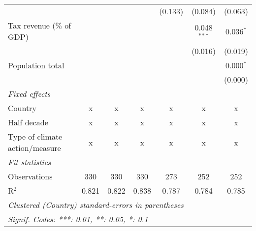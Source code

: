 \begin{tabular}{lcccccc}
                                                            &         &             &                & (0.133)        & (0.084)        & (0.063)\\   
   Tax revenue (\% of GDP)                                  &         &             &                &                & 0.048$^{***}$  & 0.036$^{*}$\\   
                                                            &         &             &                &                & (0.016)        & (0.019)\\   
   Population total                                         &         &             &                &                &                & 0.000$^{*}$\\   
                                                            &         &             &                &                &                & (0.000)\\   
   \emph{Fixed effects}\\
   Country                                                  & x       & x           & x              & x              & x              & x\\  
   Half decade                                              & x       & x           & x              & x              & x              & x\\  
   Type of climate action/measure                           & x       & x           & x              & x              & x              & x\\  
   \midrule \emph{Fit statistics}\\
   Observations                                             & 330     & 330         & 330            & 273            & 252            & 252\\  
   R$^2$                                                    & 0.821   & 0.822       & 0.838          & 0.787          & 0.784          & 0.785\\  
   \midrule
   \multicolumn{7}{l}{\emph{Clustered (Country) standard-errors in parentheses}}\\
   \multicolumn{7}{l}{\emph{Signif. Codes: ***: 0.01, **: 0.05, *: 0.1}}\\
\end{tabular}
\par\endgroup



